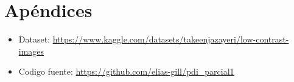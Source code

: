 \documentclass[sigchi]{acmart}
\begin{document}
\section{Apéndices}
\label{sec:apendices}

\begin{itemize}
	\item Dataset: \url{https://www.kaggle.com/datasets/takeenjazayeri/low-contrast-images}
	\item Codigo fuente: \url{https://github.com/elias-gill/pdi_parcial1}
\end{itemize}

\nocite{*} %


\label{sec:bibliography}
\end{document}
